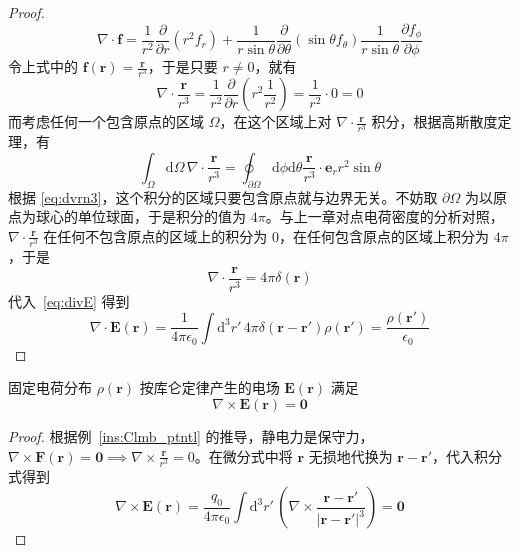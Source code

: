 \documentclass[cn,10pt,math=newtx,citestyle=gb7714-2015,bibstyle=gb7714-2015]{elegantbook}
\def\bm{\boldsymbol}
\def\d{\mathrm d}
\def\p{\partial}
\begin{document}
\begin{proof}
    \begin{equation*}
        \nabla\cdot\bm f=\frac{1}{r^2}\frac{\p}{\p r}(r^2f_r)+\frac{1}{r\sin\theta}\frac{\p}{\p\theta}(\sin\theta f_\theta)\frac{1}{r\sin\theta}\frac{\p f_\phi}{\p\phi}
    \end{equation*}
    令上式中的 $\bm f(\bm r) = \frac{\bm r}{r^3}$，于是只要 $r\ne 0$，就有
    \begin{equation}\label{eq:dvrn3}
        \nabla\cdot\frac{\bm r}{r^3} = \frac{1}{r^2}\frac{\p}{\p r}\left(r^2\frac{1}{r^2}\right) = \frac{1}{r^2}\cdot 0 = 0
    \end{equation}
    而考虑任何一个包含原点的区域 $\Omega$，在这个区域上对 $\nabla\cdot\frac{\bm r}{r^3}$ 积分，根据高斯散度定理，有
    \begin{equation*}
        \int_\Omega\d\Omega\, \nabla\cdot\frac{\bm r}{r^3} = \oint_{\p\Omega}\d\phi\d\theta\frac{\bm r}{r^3}\cdot\bm e_r r^2\sin\theta
    \end{equation*}
    根据 \ref{eq:dvrn3}，这个积分的区域只要包含原点就与边界无关。不妨取 $\p\Omega$ 为以原点为球心的单位球面，于是积分的值为 $4\pi$。与上一章对点电荷密度的分析对照，$\nabla\cdot\frac{\bm r}{r^3}$ 在任何不包含原点的区域上的积分为 0，在任何包含原点的区域上积分为 $4\pi$，于是
    \begin{equation}\label{eq:dvrgnc_sqr_invrs}
        \nabla\cdot\frac{\bm r}{r^3} = 4\pi\delta(\bm r)
    \end{equation}
    代入~\ref{eq:divE} 得到
    \begin{equation}
        \nabla\cdot\bm E(\bm r) = \frac{1}{4\pi\epsilon_0}\int\d^3 r'\, 4\pi\delta(\bm r-\bm r')\rho(\bm r') = \frac{\rho(\bm r')}{\epsilon_0}
    \end{equation}
\end{proof}

\begin{theorem}[恒定电场的无旋定律]\label{thm:elctrc_fld_crl}
    固定电荷分布 $\rho(\bm r)$ 按库仑定律产生的电场 $\bm E(\bm r)$ 满足
    \begin{equation*}
        \nabla\times\bm E(\bm r)=\bm 0
    \end{equation*}
\end{theorem}
\begin{proof}
    根据例~\ref{ins:Clmb_ptntl} 的推导，静电力是保守力，$\nabla\times\bm F(\bm r)=\bm 0\implies\nabla\times\frac{\bm r}{r^3}=0$。在微分式中将 $\bm r$ 无损地代换为 $\bm r-\bm r'$，代入积分式得到
    \begin{equation}
        \nabla\times\bm E(\bm r) = \frac{q_0}{4\pi\epsilon_0}\int\d^3r'\,\left(\nabla\times\frac{\bm r-\bm r'}{|\bm r-\bm r'|^3}\right) = \bm 0
    \end{equation}
\end{proof}
\end{document}
